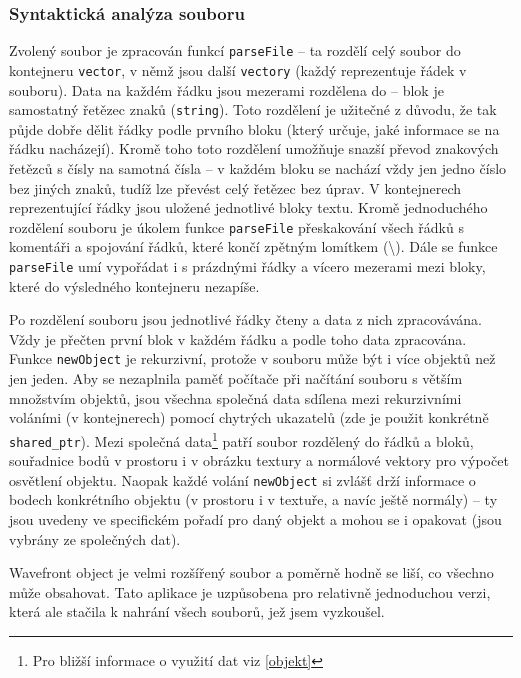 \documentclass[a4paper, 11pt]{report}
\begin{document}
\subsubsection{Syntaktická analýza souboru}
Zvolený soubor je zpracován funkcí \texttt{parseFile} -- ta rozdělí celý soubor do kontejneru \texttt{vector}, v němž jsou další \texttt{vectory} (každý reprezentuje řádek v souboru). Data na každém řádku jsou mezerami rozdělena do  -- blok je samostatný řetězec znaků (\texttt{string}). Toto rozdělení je užitečné z důvodu, že tak půjde dobře dělit řádky podle prvního bloku (který určuje, jaké informace se na řádku nacházejí). Kromě toho toto rozdělení umožňuje snazší převod znakových řetězců s čísly na samotná čísla -- v každém bloku se nachází vždy jen jedno číslo bez jiných znaků, tudíž lze převést celý řetězec bez úprav. V kontejnerech reprezentující řádky jsou uložené jednotlivé bloky textu. Kromě jednoduchého rozdělení souboru je úkolem funkce \texttt{parseFile} přeskakování všech řádků s komentáři a spojování řádků, které končí zpětným lomítkem (\textbackslash). Dále se funkce \texttt{parseFile} umí vypořádat i s prázdnými řádky a vícero mezerami mezi bloky, které do výsledného kontejneru nezapíše.

Po rozdělení souboru jsou jednotlivé řádky čteny a data z nich zpracovávána. Vždy je přečten první blok v každém řádku a podle toho data zpracována. Funkce \texttt{newObject} je rekurzivní, protože v souboru může být i více objektů než jen jeden. Aby se nezaplnila paměť počítače při načítání souboru s větším množstvím objektů, jsou všechna společná data sdílena mezi rekurzivními voláními (v kontejnerech) pomocí chytrých ukazatelů (zde je použit konkrétně \texttt{shared\_ptr}). Mezi společná data\footnote{Pro bližší informace o využití dat viz \ref{objekt}} patří soubor rozdělený do řádků a bloků, souřadnice bodů v prostoru i v obrázku textury a normálové vektory pro výpočet osvětlení objektu. Naopak každé volání \texttt{newObject} si zvlášť drží informace o bodech konkrétního objektu (v prostoru i v textuře, a navíc ještě normály) -- ty jsou uvedeny ve specifickém pořadí pro daný objekt a mohou se i opakovat (jsou vybrány ze společných dat).

Wavefront object je velmi rozšířený soubor a poměrně hodně se liší, co všechno může obsahovat. Tato aplikace je uzpůsobena pro relativně jednoduchou verzi, která ale stačila k nahrání všech souborů, jež jsem vyzkoušel.
\end{document}
